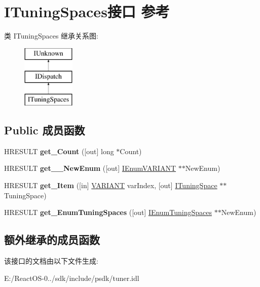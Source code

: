 \hypertarget{interface_i_tuning_spaces}{}\section{I\+Tuning\+Spaces接口 参考}
\label{interface_i_tuning_spaces}
类 I\+Tuning\+Spaces 继承关系图\+:\begin{figure}[H]
\begin{center}
\leavevmode
\includegraphics[height=3.000000cm]{interface_i_tuning_spaces}
\end{center}
\end{figure}
\subsection*{Public 成员函数}
\begin{DoxyCompactItemize}
\item 
\mbox{\label{interface_i_tuning_spaces_a9f18374aa9d90f784d62313a328b868d}} 
H\+R\+E\+S\+U\+LT {\bfseries get\+\_\+\+Count} (\mbox{[}out\mbox{]} long $\ast$Count)
\item 
\mbox{\label{interface_i_tuning_spaces_a8fc40bc75a081e79bd93d08ea2dedcd3}} 
H\+R\+E\+S\+U\+LT {\bfseries get\+\_\+\+\_\+\+New\+Enum} (\mbox{[}out\mbox{]} \hyperlink{interface_i_enum_v_a_r_i_a_n_t}{I\+Enum\+V\+A\+R\+I\+A\+NT} $\ast$$\ast$New\+Enum)
\item 
\mbox{\label{interface_i_tuning_spaces_a25dba0acf363bc07be75a8e845b9ce1c}} 
H\+R\+E\+S\+U\+LT {\bfseries get\+\_\+\+Item} (\mbox{[}in\mbox{]} \hyperlink{structtag_v_a_r_i_a_n_t}{V\+A\+R\+I\+A\+NT} var\+Index, \mbox{[}out\mbox{]} \hyperlink{interface_i_tuning_space}{I\+Tuning\+Space} $\ast$$\ast$Tuning\+Space)
\item 
\mbox{\label{interface_i_tuning_spaces_ac498c501257f18b3a04177a78f6801bc}} 
H\+R\+E\+S\+U\+LT {\bfseries get\+\_\+\+Enum\+Tuning\+Spaces} (\mbox{[}out\mbox{]} \hyperlink{interface_i_enum_tuning_spaces}{I\+Enum\+Tuning\+Spaces} $\ast$$\ast$New\+Enum)
\end{DoxyCompactItemize}
\subsection*{额外继承的成员函数}


该接口的文档由以下文件生成\+:\begin{DoxyCompactItemize}
\item 
E\+:/\+React\+O\+S-\/0../sdk/include/psdk/tuner.\+idl\end{DoxyCompactItemize}
